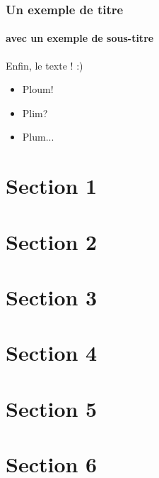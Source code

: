 \documentclass{beamer}
\begin{document}
		
		\begin{frame}
			\frametitle{Un exemple de titre}
			\framesubtitle{avec un exemple de sous-titre}
			Enfin, le texte ! :)
		\end{frame}
		
		\begin{frame}
			\begin{itemize}
				\item<1,3> Ploum!
				\item<2-4> Plim?
				\item Plum...
			\end{itemize}
		\end{frame}
		
		
		
		
		
		
		\section{Section 1}
		
		\section{Section 2}
		
		\section{Section 3}
		
		\section{Section 4}
		
		\section{Section 5}
		
		\section{Section 6}
		
		
		
		
	
\end{document}
